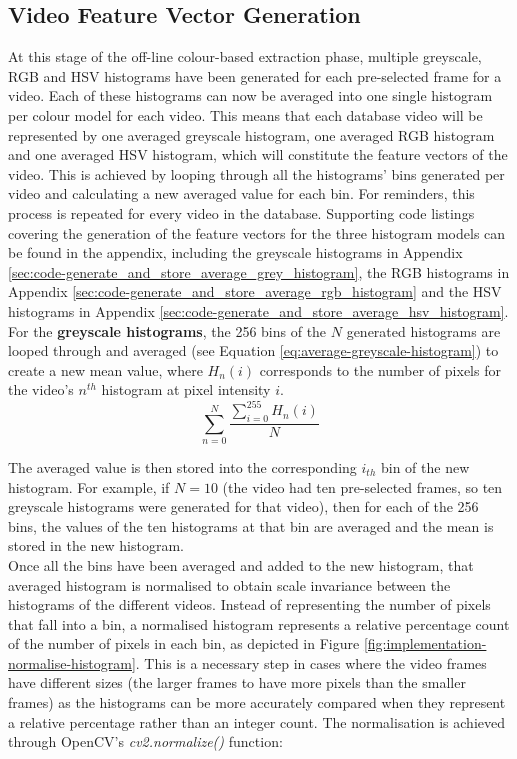 
\subsection{Video Feature Vector Generation}
\label{sec:implementation-compact-video-signature}

At this stage of the off-line colour-based extraction phase, multiple greyscale, RGB and HSV histograms have been generated for each pre-selected frame for a video. Each of these histograms can now be averaged into one single histogram per colour model for each video. This means that each database video will be represented by one averaged greyscale histogram, one averaged RGB histogram and one averaged HSV histogram, which will constitute the feature vectors of the video. This is achieved by looping through all the histograms' bins generated per video and calculating a new averaged value for each bin. For reminders, this process is repeated for every video in the database. Supporting code listings covering the generation of the feature vectors for the three histogram models can be found in the appendix, including the greyscale histograms in Appendix \ref{sec:code-generate_and_store_average_grey_histogram}, the RGB histograms in Appendix \ref{sec:code-generate_and_store_average_rgb_histogram} and the HSV histograms in Appendix \ref{sec:code-generate_and_store_average_hsv_histogram}.\\

For the \textbf{greyscale histograms}, the 256 bins of the $N$ generated histograms are looped through and averaged (see Equation \ref{eq:average-greyscale-histogram}) to create a new mean value, where $H_n(i)$ corresponds to the number of pixels for the video's $n^{th}$ histogram at pixel intensity $i$.
\begin{equation}
\label{eq:average-greyscale-histogram}
    \sum_{n=0}^{N} \frac{\sum_{i=0}^{255} H_n(i)}{N}
\end{equation}

The averaged value is then stored into the corresponding $i_{th}$ bin of the new histogram. For example, if $N=10$ (the video had ten pre-selected frames, so ten greyscale histograms were generated for that video), then for each of the 256 bins, the values of the ten histograms at that bin are averaged and the mean is stored in the new histogram.\\

Once all the bins have been averaged and added to the new histogram, that averaged histogram is normalised to obtain scale invariance between the histograms of the different videos. Instead of representing the number of pixels that fall into a bin, a normalised histogram represents a relative percentage count of the number of pixels in each bin, as depicted in Figure \ref{fig:implementation-normalise-histogram}. This is a necessary step in cases where the video frames have different sizes (the larger frames to have more pixels than the smaller frames) as the histograms can be more accurately compared when they represent a relative percentage rather than an integer count. The normalisation is achieved through OpenCV's \textit{cv2.normalize()} function:

